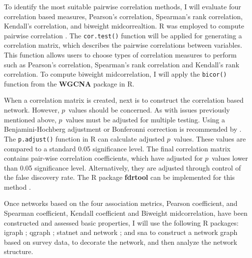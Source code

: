 To identify the most suitable pairwise correlation methods, I will evaluate four correlation based measures, Pearson's correlation, Spearman's rank correlation, Kendall's correlation, and biweight midcorrealtion. R was employed to compute pairwise correlation . The \texttt{cor.test()} function will be applied for generating a correlation matrix, which describes the pairwise correlations between variables. This function allows users to choose types of correlation measures to perform such as Pearson's correlation, Spearman's rank correlation and Kendall's rank correlation. To compute biweight midcorrelation, I will apply the \texttt{bicor()} function from the \textbf{WGCNA} package  in R. 

When a correlation matrix is created, next is to construct the correlation based network. However, $p$~values should be concerned. As with issues previously mentioned above, $p$~values must be adjusted for multiple testing. Using a Benjamini-Hochberg adjustment or Bonferonni correction is recommended by . The \texttt{p.adjust()} function in R can calculate adjusted $p$~values. These values are compared to a standard 0.05 significance level. The final correlation matrix contains pair-wise correlation coefficients, which have adjusted for $p$~values lower than 0.05 significance level. Alternatively, they are adjusted through control of the false discovery rate. The R package \textbf{fdrtool} can be implemented for this method .

Once networks based on the four association metrics, Pearson coefficient, and Spearman coefficient, Kendall coefficient and Biweight midcorrelation, have been constructed and assessed basic properties, I will use the following R packages: igraph ; qgraph ; statnet  and network ; and sna  to construct a network graph based on survey data, to decorate the network, and then analyze the network structure.

